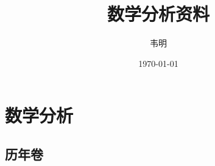 \documentclass[12pt,lang=en,thmcnt=subsection,pad]{elegantbook}
\title{数学分析资料}
\author{韦明}
\date{\today}
\numberwithin{equation}{section}
\begin{document}
\maketitle
\frontmatter

\tableofcontents

\mainmatter
\chapter{数学分析}
\section{历年卷}
\newpage

\newpage

\end{document}
